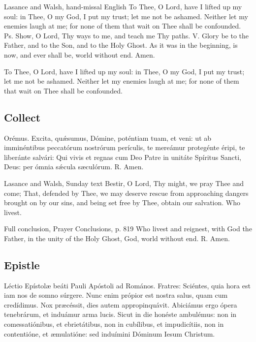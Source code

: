 \begin{englishwitness}{Lasance and Walsh, hand-missal English}
To Thee, O Lord, have I lifted up my soul: in Thee, O my God, I put my trust; let me not be ashamed. Neither let my enemies laugh at me; for none of them that wait on Thee shall be confounded. Ps. Show, O Lord, Thy ways to me, and teach me Thy paths. V. Glory be to the Father, and to the Son, and to the Holy Ghost. As it was in the beginning, is now, and ever shall be, world without end. Amen.

To Thee, O Lord, have I lifted up my soul: in Thee, O my God, I put my trust; let me not be ashamed. Neither let my enemies laugh at me; for none of them that wait on Thee shall be confounded.
\end{englishwitness}

\subsection{Collect}
\label{proper-collect}

\begin{latinproper}
Orémus. Excita, quǽsumus, Dómine, poténtiam tuam, et veni: ut ab imminéntibus peccatórum nostrórum perículis, te mereámur protegénte éripi, te liberánte salvári: Qui vivis et regnas cum Deo Patre in unitáte Spíritus Sancti, Deus: per ómnia sǽcula sæculórum. R. Amen.
\end{latinproper}

\begin{englishwitness}{Lasance and Walsh, Sunday text}
Bestir, O Lord, Thy might, we pray Thee and come; That, defended by Thee, we may deserve rescue from approaching dangers brought on by our sins, and being set free by Thee, obtain our salvation. Who livest.
\end{englishwitness}

\begin{englishwitness}{Full conclusion, Prayer Conclusions, p. 819}
Who livest and reignest, with God the Father, in the unity of the Holy Ghost, God, world without end. R. Amen.
\end{englishwitness}

\subsection{Epistle}
\label{proper-epistle}

\begin{latinproper}
Léctio Epístolæ beáti Pauli Apóstoli ad Romános. Fratres: Sciéntes, quia hora est iam nos de somno súrgere. Nunc enim própior est nostra salus, quam cum credídimus. Nox præcéssit, dies autem appropinquávit. Abiciámus ergo ópera tenebrárum, et induámur arma lucis. Sicut in die honéste ambulémus: non in comessatiónibus, et ebrietátibus, non in cubílibus, et impudicítiis, non in contentióne, et æmulatióne: sed induímini Dóminum Iesum Christum.
\end{latinproper}

